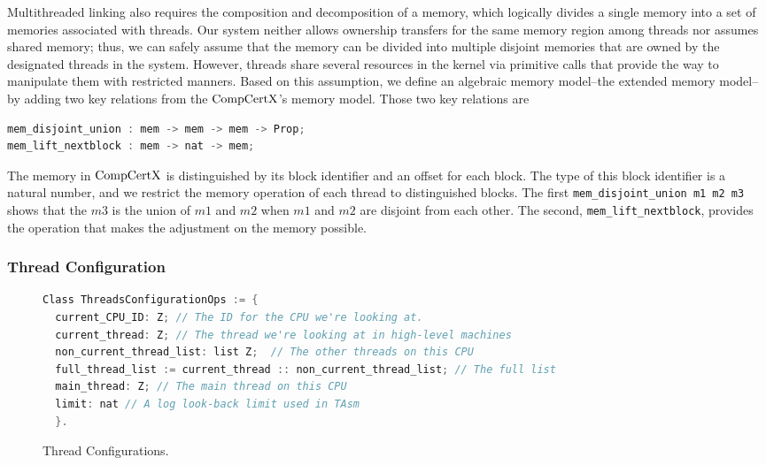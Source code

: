 Multithreaded linking also requires the composition and decomposition of a memory,
which logically divides a single memory into a set of memories associated with threads.
Our system neither allows ownership transfers for the same memory region among threads nor assumes shared memory; thus, we can safely assume that the memory can be divided into multiple disjoint memories that are owned by the designated threads in the system. 
However, threads share several resources in the kernel via primitive calls that provide the way to manipulate them with restricted manners. 
Based on this assumption, 
we define an algebraic memory model--the extended memory model--by adding two key relations from the $\mathrm{CompCertX}$'s memory model.
Those two key relations are 
\begin{lstlisting}[language=C]
mem_disjoint_union : mem -> mem -> mem -> Prop;
mem_lift_nextblock : mem -> nat -> mem;
\end{lstlisting}
The memory in $\mathrm{CompCertX}$ is distinguished by its block identifier and an offset for each block. 
The type of this block identifier is a natural number,
and we restrict the memory operation of each thread to distinguished blocks.  
The first \lstinline$mem_disjoint_union m1 m2 m3$  shows that 
the $m3$ is the union of $m1$ and $m2$ when $m1$ and $m2$ 
are disjoint from each other. 
The second, \lstinline$mem_lift_nextblock$,
provides the operation that makes the adjustment on the memory possible. 



\subsubsection{Thread Configuration}

\begin{figure}
\begin{lstlisting}[language=C, morekeywords={Class}]
Class ThreadsConfigurationOps := {      
  current_CPU_ID: Z; // The ID for the CPU we're looking at. 
  current_thread: Z; // The thread we're looking at in high-level machines
  non_current_thread_list: list Z;  // The other threads on this CPU 
  full_thread_list := current_thread :: non_current_thread_list; // The full list
  main_thread: Z; // The main thread on this CPU 
  limit: nat // A log look-back limit used in TAsm 
  }.
\end{lstlisting}
\caption{Thread Configurations.}
\label{fig:chapter:linking:thread-configurations}
\end{figure}


